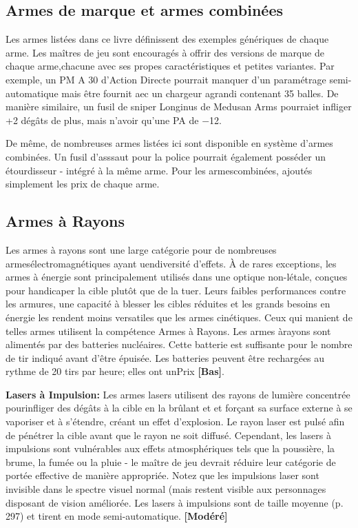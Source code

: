 \subsection{Armes de marque et armes combinées} \label{sec:brand-weapons-combined} 

Les armes listées dans ce livre définissent des exemples génériques de chaque arme. Les maîtres de jeu sont encouragés à offrir des versions de marque de chaque arme,chacune avec ses propes caractéristiques et petites variantes. Par exemple, un PM A 30 d'Action Directe pourrait manquer d'un paramétrage semi-automatique mais être fournit aec un chargeur agrandi contenant 35 balles. De manière similaire, un fusil de sniper Longinus de Medusan Arms pourraiet infliger +2 dégâts de plus, mais n'avoir qu'une PA de $-$12. 

De même, de nombreuses armes listées ici sont disponible en système d'armes combinées. Un fusil d'asssaut pour la police pourrait également posséder un étourdisseur - intégré à la même arme. Pour les armescombinées, ajoutés simplement les prix de chaque arme. 

\subsection{Armes à Rayons} \label{sec:beam-weapons} 

Les armes à rayons sont une large catégorie pour de nombreuses armesélectromagnétiques ayant uendiversité d'effets. À de rares exceptions, les armes à énergie sont principalement utilisés dans une optique non-létale, conçues pour handicaper la cible plutôt que de la tuer. Leurs faibles performances contre les armures, une capacité à blesser les cibles réduites et les grands besoins en énergie les rendent moins versatiles que les armes cinétiques. Ceux qui manient de telles armes utilisent la compétence Armes à Rayons. Les armes àrayons sont alimentés par des batteries nucléaires. Cette batterie est suffisante pour le nombre de tir indiqué avant d'être épuisée. Les batteries peuvent être rechargées au rythme de 20 tirs par heure; elles ont unPrix \textbf{[Bas]}. 

\textbf{Lasers à Impulsion:} Les armes lasers utilisent des rayons de lumière concentrée pourinfliger des dégâts à la cible en la brûlant et et forçant sa surface externe à se vaporiser et à s'étendre, créant un effet d'explosion. Le rayon laser est pulsé afin de pénétrer la cible avant que le rayon ne soit diffusé. Cependant, les lasers à impulsions sont vulnérables aux effets atmosphériques tels que la poussière, la brume, la fumée ou la pluie - le maître de jeu devrait réduire leur catégorie de portée effective de manière appropriée. Notez que les impulsions laser sont invisible dans le spectre visuel normal (mais restent visible aux personnages disposant de vision améliorée. Les lasers à impulsions sont de taille moyenne (p. 297) et tirent en mode semi-automatique. \textbf{[Modéré]} 

